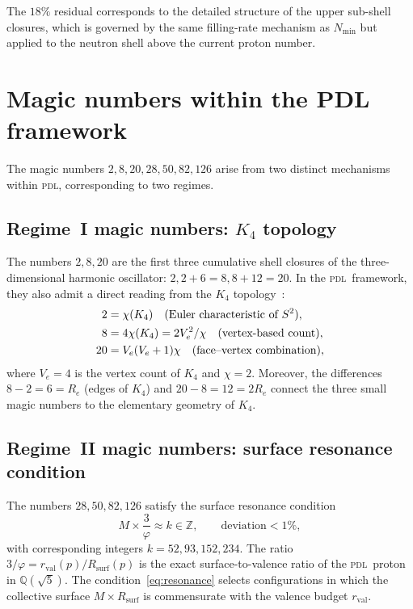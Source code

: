 \documentclass{article}
\theoremstyle{remark}
\newcommand{\PDL}{\textsc{pdl}}
\newcommand{\Kfour}{K_4}
\newcommand{\Rsurf}{R_{\mathrm{surf}}}
\newcommand{\rval}{r_{\mathrm{val}}}
\newcommand{\Nmin}{N_{\min}}
\newcommand{\vp}{\varphi}
\begin{document}
The $18\%$ residual corresponds to the detailed structure of the upper sub-shell closures, which is governed by the same filling-rate mechanism as $\Nmin$ but applied to the neutron shell above the current proton number.

\section{Magic numbers within the PDL framework}
\label{sec:magic}

The magic numbers $2, 8, 20, 28, 50, 82, 126$ arise from two distinct mechanisms within \PDL, corresponding to two regimes.

\subsection{Regime~I magic numbers: \texorpdfstring{$K_4$}{K4} topology}

The numbers $2, 8, 20$ are the first three cumulative shell closures of the three-dimensional harmonic oscillator: $2, 2+6=8, 8+12=20$. In the \PDL\ framework, they also admit a direct reading from the $\Kfour$ topology~\cite{D23}:
\begin{align}
  2 &= \chi(\Kfour) \quad \text{(Euler characteristic of $S^2$)}, \notag\\
  8 &= 4\chi(\Kfour) = 2V_e^2/\chi \quad \text{(vertex-based count)}, \notag\\
  20 &= V_e(V_e+1)\chi \quad \text{(face--vertex combination)}, \notag
\end{align}
where $V_e = 4$ is the vertex count of $\Kfour$ and $\chi = 2$. Moreover, the differences $8-2 = 6 = R_e$ (edges of $\Kfour$) and $20-8 = 12 = 2R_e$ connect the three small magic numbers to the elementary geometry of $\Kfour$.

\subsection{Regime~II magic numbers: surface resonance condition}

The numbers $28, 50, 82, 126$ satisfy the surface resonance condition
\begin{equation}
  M \times \frac{3}{\vp} \approx k \in \mathbb{Z}, \qquad \text{deviation} < 1\%,
  \label{eq:resonance}
\end{equation}
with corresponding integers $k = 52, 93, 152, 234$. The ratio $3/\vp = \rval(p)/\Rsurf(p)$ is the exact surface-to-valence ratio of the \PDL\ proton in $\mathbb{Q}(\sqrt{5})$. The condition~\eqref{eq:resonance} selects configurations in which the collective surface $M \times \Rsurf$ is commensurate with the valence budget $\rval$.
\end{document}
